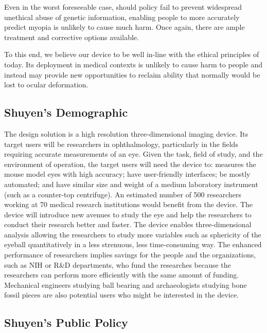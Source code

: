 \documentclass{article}
\begin{document}
Even in the worst foreseeable case, should policy fail to prevent
widespread unethical abuse of genetic information, enabling people to
more accurately predict myopia is unlikely to cause much harm. Once
again, there are ample treatment and corrective options available.

To this end, we believe our device to be well in-line with the ethical
principles of today. Its deployment in medical contexts is unlikely
to cause harm to people and instead may provide new opportunities to
reclaim ability that normally would be lost to ocular deformation.

\subsection{Shuyen's Demographic}
\label{sec:Demographic}

The design solution is a high resolution three-dimensional imaging
device.  Its target users will be researchers in ophthalmology,
particularly in the fields requiring accurate measurements of an
eye. Given the task, field of study, and the environment of operation,
the target users will need the device to: measures the mouse model
eyes with high accuracy; have user-friendly interfaces; be mostly
automated; and have similar size and weight of a medium laboratory
instrument (such as a counter-top centrifuge). An estimated number of
500 researchers working at 70 medical research institutions would
benefit from the device. The device will introduce new avenues to
study the eye and help the researchers to conduct their research
better and faster. The device enables three-dimensional analysis
allowing the researchers to study more variables such as sphericity of
the eyeball quantitatively in a less strenuous, less time-consuming
way. The enhanced performance of researchers implies savings for the
people and the organizations, such as NIH or R\&D departments, who
fund the researches because the researchers can perform more
efficiently with the same amount of funding. Mechanical engineers
studying ball bearing and archaeologists studying bone fossil pieces
are also potential users who might be interested in the device.
	
\subsection{Shuyen's Public Policy}
\label{sec:Public Policy}
\end{document}
